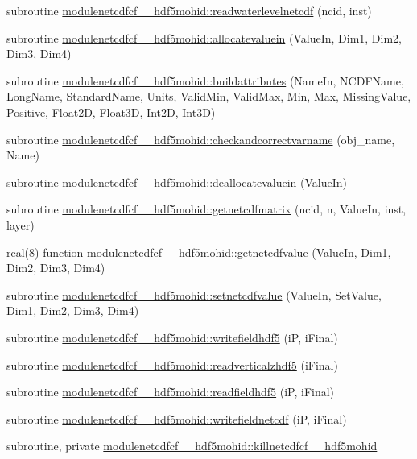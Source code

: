 \begin{DoxyCompactItemize}
\item 
subroutine \mbox{\hyperlink{namespacemodulenetcdfcf__2__hdf5mohid_a09c9e8d6a98c36d9bf0fe0c733ded2ce}{modulenetcdfcf\+\_\+\_\+hdf5mohid\+::readwaterlevelnetcdf}} (ncid, inst)
\item 
subroutine \mbox{\hyperlink{namespacemodulenetcdfcf__2__hdf5mohid_af854968676c4e6f1d5d76e704087ae86}{modulenetcdfcf\+\_\+\_\+hdf5mohid\+::allocatevaluein}} (Value\+In, Dim1, Dim2, Dim3, Dim4)
\item 
subroutine \mbox{\hyperlink{namespacemodulenetcdfcf__2__hdf5mohid_a9dbafb9898bd3f5184bc0e6cd96e5fbc}{modulenetcdfcf\+\_\+\_\+hdf5mohid\+::buildattributes}} (Name\+In, N\+C\+D\+F\+Name, Long\+Name, Standard\+Name, Units, Valid\+Min, Valid\+Max, Min, Max, Missing\+Value, Positive, Float2D, Float3D, Int2D, Int3D)
\item 
subroutine \mbox{\hyperlink{namespacemodulenetcdfcf__2__hdf5mohid_ac0196286655bc4a08fbda809ca8d39e9}{modulenetcdfcf\+\_\+\_\+hdf5mohid\+::checkandcorrectvarname}} (obj\+\_\+name, Name)
\item 
subroutine \mbox{\hyperlink{namespacemodulenetcdfcf__2__hdf5mohid_a270019f12c3ed995eab2d0a7dcb103cc}{modulenetcdfcf\+\_\+\_\+hdf5mohid\+::deallocatevaluein}} (Value\+In)
\item 
subroutine \mbox{\hyperlink{namespacemodulenetcdfcf__2__hdf5mohid_a788802bec9e3806cfd877eb5bf6d2fef}{modulenetcdfcf\+\_\+\_\+hdf5mohid\+::getnetcdfmatrix}} (ncid, n, Value\+In, inst, layer)
\item 
real(8) function \mbox{\hyperlink{namespacemodulenetcdfcf__2__hdf5mohid_a8bdc7928ff8c39c76b2c5fda4b90f2c5}{modulenetcdfcf\+\_\+\_\+hdf5mohid\+::getnetcdfvalue}} (Value\+In, Dim1, Dim2, Dim3, Dim4)
\item 
subroutine \mbox{\hyperlink{namespacemodulenetcdfcf__2__hdf5mohid_a0a54d00603078be80ce02d8fb4b8a827}{modulenetcdfcf\+\_\+\_\+hdf5mohid\+::setnetcdfvalue}} (Value\+In, Set\+Value, Dim1, Dim2, Dim3, Dim4)
\item 
subroutine \mbox{\hyperlink{namespacemodulenetcdfcf__2__hdf5mohid_a9a0ad1eb97650a07ad08d1d3d20271ad}{modulenetcdfcf\+\_\+\_\+hdf5mohid\+::writefieldhdf5}} (iP, i\+Final)
\item 
subroutine \mbox{\hyperlink{namespacemodulenetcdfcf__2__hdf5mohid_a5ea0bf1216f1cdc72e51ebf22b85884e}{modulenetcdfcf\+\_\+\_\+hdf5mohid\+::readverticalzhdf5}} (i\+Final)
\item 
subroutine \mbox{\hyperlink{namespacemodulenetcdfcf__2__hdf5mohid_af3d93c43025a8ea4bfc12e430d456ac3}{modulenetcdfcf\+\_\+\_\+hdf5mohid\+::readfieldhdf5}} (iP, i\+Final)
\item 
subroutine \mbox{\hyperlink{namespacemodulenetcdfcf__2__hdf5mohid_ab5904631b48441b51fae172f8cfe49f4}{modulenetcdfcf\+\_\+\_\+hdf5mohid\+::writefieldnetcdf}} (iP, i\+Final)
\item 
subroutine, private \mbox{\hyperlink{namespacemodulenetcdfcf__2__hdf5mohid_abe222a22b3453e9024edf051cf78ade8}{modulenetcdfcf\+\_\+\_\+hdf5mohid\+::killnetcdfcf\+\_\+\_\+hdf5mohid}}
\end{DoxyCompactItemize}
